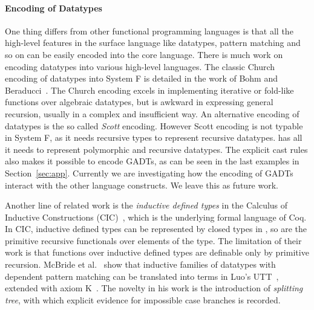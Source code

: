 \paragraph{Encoding of Datatypes}
One thing \name differs from other functional programming languages is
that all the high-level features in the surface language like
datatypes, pattern matching and so on can be easily encoded into the
core language. There is much work on encoding datatypes into various
high-level languages. The classic Church encoding of datatypes into
System F is detailed in the work of Bohm and
Beraducci~\cite{Bohm1985}. The Church encoding excels in implementing
iterative or fold-like functions over algebraic datatypes, but is
awkward in expressing general recursion, usually in a complex and
insufficient way. An alternative encoding of datatypes is the so
called \emph{Scott} encoding. However Scott encoding is not typable in
System F, as it needs recursive types to represent recursive
datatypes. \name has all it needs to represent polymorphic and
recursive datatypes. The explicit cast rules also makes it possible to
encode GADTs, as can be seen in the last examples in
Section~\ref{sec:app}. Currently we are investigating how the encoding
of GADTs interact with the other language constructs. We leave this as
future work.

Another line of related work is the \emph{inductive defined types} in
the Calculus of Inductive Constructions (CIC)~\cite{cic}, which is the
underlying formal language of Coq. In CIC, inductive defined types can
be represented by closed types in \coc, so are the primitive recursive
functionals over elements of the type. The limitation of their work is
that functions over inductive defined types are definable only by
primitive recursion. McBride et al.~\cite{elim:pi:pattern} show that
inductive families of datatypes with dependent pattern matching can be
translated into terms in Luo's UTT~\cite{Luo:UTT}, extended with axiom
K~\cite{axiomK}. The novelty in his work is the introduction of
\emph{splitting tree}, with which explicit evidence for impossible
case branches is recorded.



